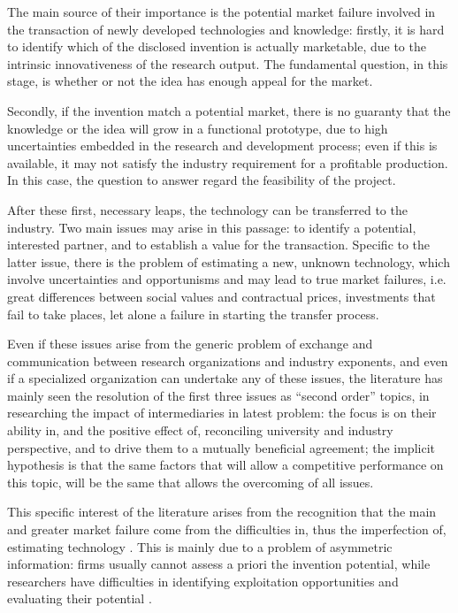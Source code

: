 The main source of their importance is the potential market failure involved in the transaction of newly developed technologies and knowledge: firstly, it is hard to identify which of the disclosed invention is actually marketable, due to the intrinsic innovativeness of the research output. The fundamental question, in this stage, is whether or not the idea has enough appeal for the market.

Secondly, if the invention match a potential market, there is no guaranty that the knowledge or the idea will grow in a functional prototype, due to high uncertainties embedded in the research and development process; even if this is available, it may not satisfy the industry requirement for a profitable production. In this case, the question to answer regard the feasibility of the project.

After these first, necessary leaps, the technology can be transferred to the industry. Two main issues may arise in this passage: to identify a potential, interested partner, and to establish a value for the transaction. Specific to the latter issue, there is the problem of estimating a new, unknown technology, which involve uncertainties and opportunisms and may lead to true market failures, i.e. great differences between social values and contractual prices, investments that fail to take places, let alone a failure in starting the transfer process.

Even if these issues arise from the generic problem of exchange and communication between research organizations and industry exponents, and even if a specialized organization can undertake any of these issues, the literature has mainly seen the resolution of the first three issues as \enquote{second order} topics, in researching the impact of intermediaries in latest problem: the focus is on their ability in, and the positive effect of, reconciling university and industry perspective, and to drive them to a mutually beneficial agreement; the implicit hypothesis is that the same factors that will allow a competitive performance on this topic, will be the same that allows the overcoming of all issues.

This specific interest of the literature arises from the recognition that the main and greater market failure come from the difficulties in, thus the imperfection of, estimating technology \citep{Hoppe2005}. This is mainly due to a problem of asymmetric information: firms usually cannot assess a priori the invention potential, while researchers have difficulties in identifying exploitation opportunities and evaluating their potential \citep{Debackere2005}. 

